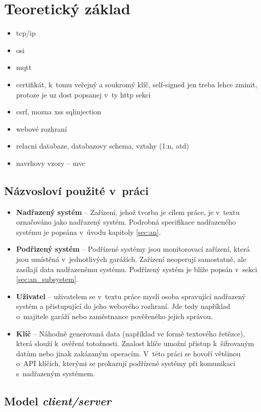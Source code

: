 \chapter{Teoretický základ}
\label{sec:te}
\begin{itemize}
    \item tcp/ip
    \item osi
    \item mqtt
    \item certifikát, k~tomu veřejný a soukromý klíč, self-signed jen treba lehce zminit, protoze je uz dost popsanej v~ty http sekci
    \item csrf, mozna xss sqlinjection
    \item webové rozhraní
    \item relacni databaze, databazovy schema, vztahy (1:n, atd)
    \item navrhovy vzory -- mvc
\end{itemize}

\section{Názvosloví použité v~práci}

\begin{itemize}
    \item \textbf{Nadřazený systém} -- Zařízení, jehož tvorba je cílem práce, je v~textu označováno jako nadřazený systém. Podrobná specifikace nadřazeného systému je popsána v~úvodu kapitoly \ref{sec:an}.
    \item \textbf{Podřizený systém} -- Podřízené systémy jsou monitorovací zařízení, která jsou umístěná v~jednotlivých garážích. Zařízení neoperují samostatně, ale zasílají data nadřazenému systému. Podřízený systém je blíže popsán v~sekci \ref{sec:an_subsystem}.
    \item \textbf{Uživatel} -- uživatelem se v~textu práce myslí osoba spravující nadřazený systém a přistupující do jeho webového rozhraní. Jde tedy například o~majitele garáží nebo zaměstnance pověřeného jejich správou.
    \item \textbf{Klíč} -- Náhodně generovaná data (například ve formě textového řetězce), která slouží k~ověření totožnosti. Znalost klíče umožní přístup k~šifrovaným datům nebo jinak zakázaným operacím. V~této práci se hovoří většinou o~API klíčích, kterými se prokazují podřízené systémy při komunikaci s~nadřazeným systémem.
\end{itemize}

\section{Model \textit{client/server}}

